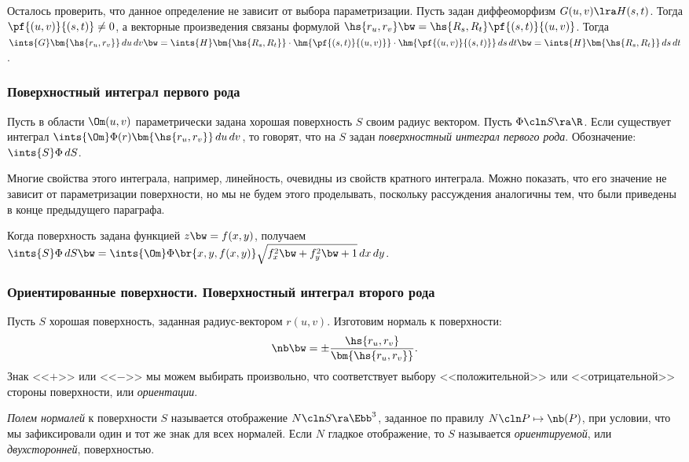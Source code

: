 \documentclass[a4paper]{article}
\begin{document}
Осталось проверить, что данное определение не зависит от выбора параметризации. Пусть задан диффеоморфизм
$G(u,v) \lra H(s,t)$. Тогда $\pf{(u,v)}{(s,t)} \neq 0$, а векторные произведения связаны формулой $\hs{r_u,
r_v} \bw= \hs{R_s, R_t} \pf{(s,t)}{(u,v)}$. Тогда $\ints{G}\bm{\hs{r_u, r_v}}\,d u\,d v \bw=
\ints{H}\bm{\hs{R_s, R_t}}\cdot\hm{\pf{(s,t)}{(u,v)}}\cdot\hm{\pf{(u,v)}{(s,t)}}\,d s\,d t\bw=
\ints{H}\bm{\hs{R_s, R_t}}\,d s\,d t$.

\subsubsection{Поверхностный интеграл первого рода}

\begin{df}
Пусть в области $\Om(u,v)$ параметрически задана хорошая поверхность $S$ своим радиус вектором. Пусть
$\Phi\cln S\ra \R$. Если существует интеграл $\ints{\Om}\Phi(r)\bm{\hs{r_u, r_v}}\,d u \,d v$, то говорят,
что на $S$ задан \emph{поверхностный интеграл первого рода}. Обозначение: $\ints{S}\Phi\,d S$.
\end{df}

Многие свойства этого интеграла, например, линейность, очевидны из свойств кратного интеграла. Можно
показать, что его значение не зависит от параметризации поверхности, но мы не будем этого проделывать,
поскольку рассуждения аналогичны тем, что были приведены в конце предыдущего параграфа.

Когда поверхность задана функцией $z \bw= f(x,y)$, получаем $\ints{S}\Phi\,d S \bw=
\ints{\Om}\Phi\br{x,y,f(x,y)}\sqrt{f_x^2 \bw+ f_y^2 \bw+ 1}\,d x \,d y$.

\subsubsection{Ориентированные поверхности. Поверхностный интеграл второго рода}

Пусть $S$ хорошая поверхность, заданная радиус-вектором $r(u,v)$. Изготовим нормаль к поверхности:
$$\nb \bw= \pm \frac{\hs{r_u, r_v}}{\bm{\hs{r_u,r_v}}}.$$
Знак <<$+$>> или <<$-$>> мы можем выбирать произвольно, что соответствует выбору <<положительной>>
или <<отрицательной>> стороны поверхности, или \emph{ориентации}.

\begin{df}
\emph{Полем нормалей} к поверхности $S$ называется отображение $N\cln S \ra \Ebb^3$, заданное по правилу
$N\cln P \mapsto \nb(P)$, при условии, что мы зафиксировали один и тот же знак для всех нормалей. Если $N$
гладкое отображение, то $S$ называется \emph{ориентируемой}, или \emph{двухсторонней}, поверхностью.
\end{df}
\end{document}
